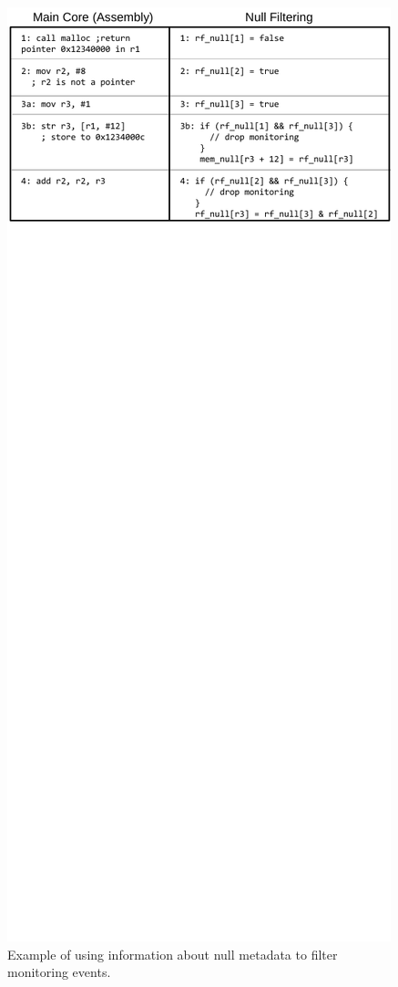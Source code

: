 \begin{figure}
  \begin{center}
    \includegraphics[width=\columnwidth]{figs/example_null_filtering.pdf}
    \vspace{-0.2in}
    \caption{Example of using information about null metadata to filter monitoring events.}
    \label{fig:dropping.example_null} 
    \vspace{-0.1in}
  \end{center}
\end{figure}

